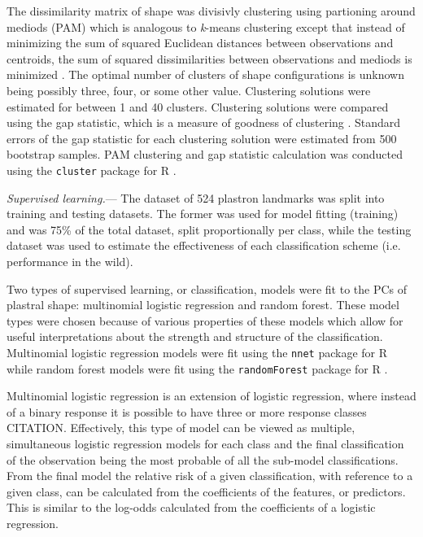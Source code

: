 \documentclass[12pt,letterpaper]{article}\usepackage{graphicx, color}
\renewcommand{\subsubsection}[1]{%
\vspace{2ex}
\noindent
\textit{#1.}---}
\begin{document}
The dissimilarity matrix of shape was divisivly clustering using partioning around mediods (PAM) which is analogous to \textit{k}-means clustering except that instead of minimizing the sum of squared Euclidean distances between observations and centroids, the sum of squared dissimilarities between observations and mediods is minimized \citep{Kaufman1990}.
The optimal number of clusters of shape configurations is unknown being possibly three, four, or some other value. Clustering solutions were estimated for between 1 and 40 clusters. Clustering solutions were compared using the gap statistic, which is a measure of goodness of clustering \citep{Tibshirani2001a}. Standard errors of the gap statistic for each clustering solution were estimated from 500 bootstrap samples.
PAM clustering and gap statistic calculation was conducted using the \texttt{cluster} package for R \citep{Maechler2013}.

\subsubsection{Supervised learning}
The dataset of 524 plastron landmarks was split into training and testing datasets. The former was used for model fitting (training) and was 75\% of the total dataset, split proportionally per class, while the testing dataset was used to estimate the effectiveness of each classification scheme (i.e. performance in the wild).

Two types of supervised learning, or classification, models were fit to the PCs of plastral shape: multinomial logistic regression and random forest. These model types were chosen because of various properties of these models which allow for useful interpretations about the strength and structure of the classification. Multinomial logistic regression models were fit using the \texttt{nnet} package for R \citep{Venables2002} while random forest models were fit using the \texttt{randomForest} package for R \citep{Liaw2002}.

Multinomial logistic regression is an extension of logistic regression, where instead of a binary response it is possible to have three or more response classes CITATION. Effectively, this type of model can be viewed as multiple, simultaneous logistic regression models for each class and the final classification of the observation being the most probable of all the sub-model classifications. From the final model the relative risk of a given classification, with reference to a given class, can be calculated from the coefficients of the features, or predictors. This is similar to the log-odds calculated from the coefficients of a logistic regression.
\end{document}
